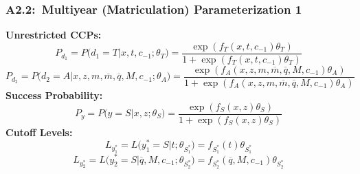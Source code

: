 \documentclass[12pt, aspectratio=169]{beamer}
\begin{document}
\begin{frame}[label=mmp1]
\frametitle{A2.2:\ Multiyear (Matriculation) Parameterization 1}
\textbf{Unrestricted CCPs:}
\begin{equation*}
P_{d_1} = P\big(d_1=T\big|x,t,c_{-1};\theta_T\big) = \frac{\exp(f_T(x,t,c_{-1})\theta_T)}{1+\exp(f_T(x,t,c_{-1})\theta_T)}
\end{equation*}
\begin{equation*}
P_{d_2} = P\big(d_2=A\big|x,z,m,\overline{m},\overline{q},M,c_{-1};\theta_A\big) = \frac{\exp(f_A(x,z,m,\overline{m},\overline{q},M,c_{-1})\theta_A)}{1+\exp(f_A(x,z,m,\overline{m},\overline{q},M,c_{-1})\theta_A)}
\end{equation*}
\textbf{Success Probability:}
\begin{equation*}
P_y = P\big(y = S\big|x,z;\theta_S\big) = \frac{\exp(f_S(x,z)\theta_S)}{1+\exp(f_S(x,z)\theta_S)}
\end{equation*}
\textbf{Cutoff Levels:}
\begin{equation*}
L_{y_1^*} = L\big(y_1^* = S\big|t;\theta_{S_1^*}\big) = f_{S_1^*}(t)\theta_{S_1^*}
\end{equation*}
\begin{equation*}
L_{y_2^*} = L\big(y_2^* = S\big|\overline{q},M,c_{-1};\theta_{S_2^*}\big) = f_{S_2^*}(\overline{q},M,c_{-1})\theta_{S_2^*}
\end{equation*}
\hyperlink{conc}{}
\end{frame}
\end{document}
